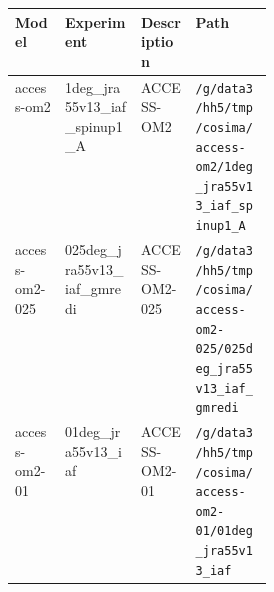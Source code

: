
\begin{tabularx}{\linewidth}{lXXp{0.3\linewidth}}
\hline
\textbf{Model} & \textbf{Experiment} & \textbf{Description} & \textbf{Path} \\
\hline

access-om2 & 1deg_jra55v13_iaf_spinup1_A & ACCESS-OM2 & \texttt{\slash g\slash data3\slash hh5\slash tmp\slash cosima\slash access-om2\slash 1deg_jra55v13_iaf_spinup1_A}\\
access-om2-025 & 025deg_jra55v13_iaf_gmredi & ACCESS-OM2-025 & \texttt{\slash g\slash data3\slash hh5\slash tmp\slash cosima\slash access-om2-025\slash 025deg_jra55v13_iaf_gmredi}\\
access-om2-01 & 01deg_jra55v13_iaf & ACCESS-OM2-01 & \texttt{\slash g\slash data3\slash hh5\slash tmp\slash cosima\slash access-om2-01\slash 01deg_jra55v13_iaf}\\

\hline
\hline
\end{tabularx}
